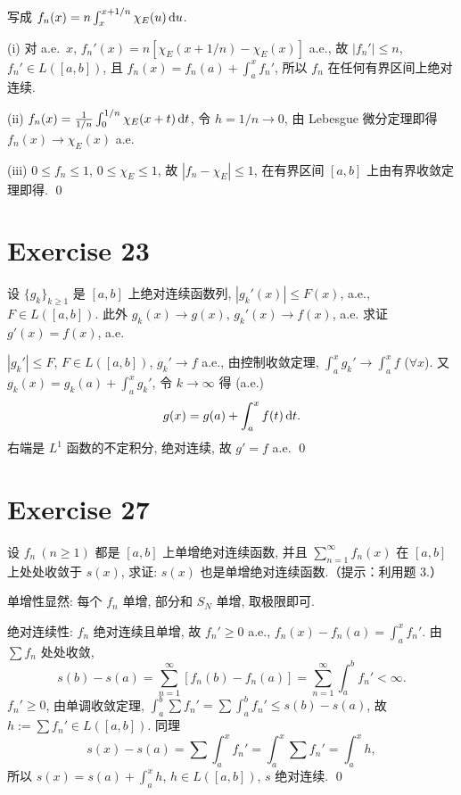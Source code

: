 \documentclass{article}
\begin{document}
\begin{solution}
  写成 $f_n(x)=n\int_x^{x+1/n}\chi_E(u)\,\mathrm{d} u$.

  (i)\; 对 a.e.\ $x$, $f_n'(x)=n[\chi_E(x+1/n)-\chi_E(x)]$ a.e., 故 $|f_n'|\le n$,
  $f_n'\in L([a,b])$, 且 $f_n(x)=f_n(a)+\int_a^x f_n'$, 所以 $f_n$ 在任何有界区间上绝对连续.

  (ii)\; $f_n(x)=\frac{1}{1/n}\int_0^{1/n}\chi_E(x+t)\,\mathrm{d} t$, 令 $h=1/n\to 0$,
  由 Lebesgue 微分定理即得 $f_n(x)\to\chi_E(x)$ a.e.

  (iii)\; $0\le f_n\le 1$, $0\le\chi_E\le 1$, 故 $|f_n-\chi_E|\le 1$,
  在有界区间 $[a,b]$ 上由有界收敛定理即得. \qed
\end{solution}

\section{Exercise 23}

设 $\{g_k\}_{k \ge 1}$ 是 $[a,b]$ 上绝对连续函数列, $|g_k'(x)| \le F(x)$, a.e., $F \in L([a,b])$. 此外 $g_k(x) \to g(x)$, $g_k'(x) \to f(x)$, a.e. 求证 $g'(x) = f(x)$, a.e.

\begin{solution}
  $|g_k'|\le F$, $F\in L([a,b])$, $g_k'\to f$ a.e., 由控制收敛定理,
  $\int_a^x g_k'\to\int_a^x f$ ($\forall x$).
  又 $g_k(x)=g_k(a)+\int_a^x g_k'$, 令 $k\to\infty$ 得 (a.e.)
  \[
    g(x)=g(a)+\int_a^x f(t)\,\mathrm{d} t.
  \]
  右端是 $L^1$ 函数的不定积分, 绝对连续, 故 $g'=f$ a.e. \qed
\end{solution}

\section{Exercise 27}

设 $f_n\ (n \ge 1)$ 都是 $[a,b]$ 上单增绝对连续函数, 并且 $\sum_{n=1}^{\infty} f_n(x)$ 在 $[a,b]$ 上处处收敛于 $s(x)$, 求证: $s(x)$ 也是单增绝对连续函数.（提示：利用题 3.）

\begin{solution}
  单增性显然: 每个 $f_n$ 单增, 部分和 $S_N$ 单增, 取极限即可.

  绝对连续性: $f_n$ 绝对连续且单增, 故 $f_n'\ge 0$ a.e.,
  $f_n(x)-f_n(a)=\int_a^x f_n'$.
  由 $\sum f_n$ 处处收敛,
  \[
    s(b)-s(a)=\sum_{n=1}^{\infty}[f_n(b)-f_n(a)]
    =\sum_{n=1}^{\infty}\int_a^b f_n'<\infty.
  \]
  $f_n'\ge 0$, 由单调收敛定理,
  $\int_a^b\sum f_n'=\sum\int_a^b f_n'\le s(b)-s(a)$,
  故 $h:=\sum f_n'\in L([a,b])$.
  同理
  \[
    s(x)-s(a)=\sum\int_a^x f_n'
    =\int_a^x\sum f_n'=\int_a^x h,
  \]
  所以 $s(x)=s(a)+\int_a^x h$, $h\in L([a,b])$, $s$ 绝对连续. \qed
\end{solution}
\end{document}
